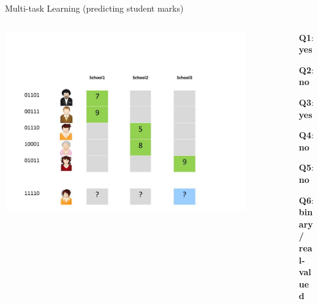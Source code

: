 \documentclass[]{beamer}
\begin{document}
\begin{frame}
{Multi-task Learning (predicting student marks)}

\begin{columns}

\begin{column}{9cm}
\includegraphics[width=0.9\textwidth,trim = 0 0 100 100,clip]{Figures/pictures/Slide3}
\end{column}

\begin{column}{7cm}
\begin{itemize}
\itemindent=2pt    \item [\textbf{Q1}:] \textbf{yes}
\itemindent=2pt    \item [\textbf{Q2}:] \textbf{no}
\itemindent=2pt    \item [\textbf{Q3}:] \textbf{yes}
\itemindent=2pt    \item [\textbf{Q4}:] \textbf{no}
\itemindent=2pt    \item [\textbf{Q5}:] \textbf{\color{red}no}
\itemindent=2pt    \item [\textbf{Q6}:]  \textbf{binary/\\real-valued}
\end{itemize}
\end{column}

\end{columns}
\end{frame}
\end{document}
